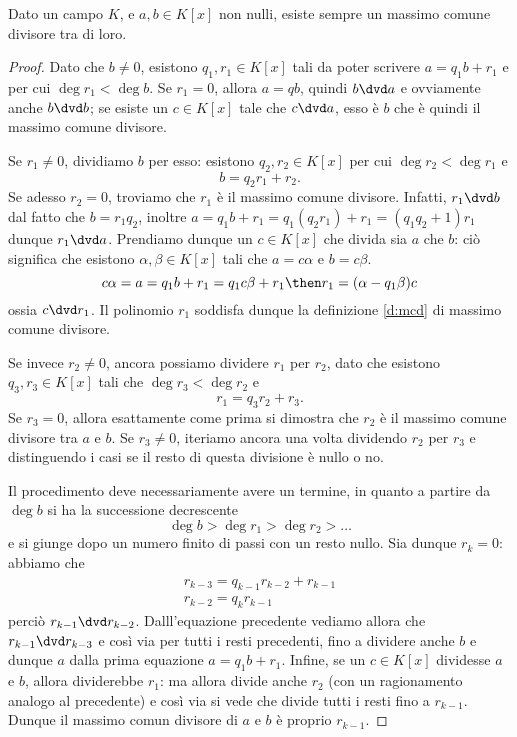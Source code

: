 \begin{teorema} \label{t:esistenza-mcd}
	Dato un campo $K$, e $a,b\in K[x]$ non nulli, esiste sempre un massimo comune divisore tra di loro.
\end{teorema}
\begin{proof}
	Dato che $b\neq 0$, esistono $q_1,r_1\in K[x]$ tali da poter scrivere $a=q_1b+r_1$ e per cui $\deg r_1<\deg b$.
	Se $r_1=0$, allora $a=qb$, quindi $b\dvd a$ e ovviamente anche $b\dvd b$; se esiste un $c\in K[x]$ tale che $c\dvd a$, esso è $b$ che è quindi il massimo comune divisore. %
	
	Se $r_1\ne 0$, dividiamo $b$ per esso: esistono $q_2,r_2\in K[x]$ per cui $\deg r_2<\deg r_1$ e
	\begin{equation}
		b=q_2r_1+r_2.
	\end{equation}
	Se adesso $r_2=0$, troviamo che $r_1$ è il massimo comune divisore.
	Infatti, $r_1\dvd b$ dal fatto che $b=r_1q_2$, inoltre $a=q_1b+r_1=q_1(q_2r_1)+r_1=(q_1q_2+1)r_1$ dunque $r_1\dvd a$.
	Prendiamo dunque un $c\in K[x]$ che divida sia $a$ che $b$: ciò significa che esistono $\alpha,\beta\in K[x]$ tali che $a=c\alpha$ e $b=c\beta$.
	\begin{equation}
		c\alpha=a=q_1b+r_1=q_1c\beta+r_1\then r_1=(\alpha-q_1\beta)c
	\end{equation}
	ossia $c\dvd r_1$.
	Il polinomio $r_1$ soddisfa dunque la definizione \ref{d:mcd} di massimo comune divisore.

	Se invece $r_2\ne 0$, ancora possiamo dividere $r_1$ per $r_2$, dato che esistono $q_3,r_3\in K[x]$ tali che $\deg r_3<\deg r_2$ e
	\begin{equation}
		r_1=q_3r_2+r_3.
	\end{equation}
	Se $r_3=0$, allora esattamente come prima si dimostra che $r_2$ è il massimo comune divisore tra $a$ e $b$.
	Se $r_3\ne 0$, iteriamo ancora una volta dividendo $r_2$ per $r_3$ e distinguendo i casi se il resto di questa divisione è nullo o no.

	Il procedimento deve necessariamente avere un termine, in quanto a partire da $\deg b$ si ha la successione decrescente
	\begin{equation}
		\deg b>\deg r_1>\deg r_2>\dots
	\end{equation}
	e si giunge dopo un numero finito di passi con un resto nullo.
	Sia dunque $r_k=0$: abbiamo che
	\begin{equation}
		\begin{gathered}
			r_{k-3}=q_{k-1}r_{k-2}+r_{k-1}\\
			r_{k-2}=q_kr_{k-1}
		\end{gathered}
	\end{equation}
	perciò $r_{k-1}\dvd r_{k-2}$.
	Dalll'equazione precedente vediamo allora che $r_{k-1}\dvd r_{k-3}$ e cos\`i via per tutti i resti precedenti, fino a dividere anche $b$ e dunque $a$ dalla prima equazione $a=q_1b+r_1$.
	Infine, se un $c\in K[x]$ dividesse $a$ e $b$, allora dividerebbe $r_1$: ma allora divide anche $r_2$ (con un ragionamento analogo al precedente) e cos\`i via si vede che divide tutti i resti fino a $r_{k-1}$.
	Dunque il massimo comun divisore di $a$ e $b$ è proprio $r_{k-1}$.
\end{proof}

